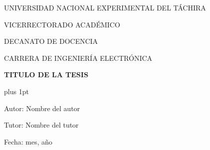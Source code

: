 \begin{center}
	\begin{spacing}{1}
		UNIVERSIDAD NACIONAL EXPERIMENTAL DEL TÁCHIRA
		
		VICERRECTORADO ACADÉMICO
		
		DECANATO DE DOCENCIA
		
		CARRERA DE INGENIERÍA ELECTRÓNICA
	
		\vspace{30pt}

		{\large \textbf{TITULO DE LA TESIS}\par}
	
	\end{spacing}
\end{center}

\vspace{20pt}

\begin{flushright}
	\begin{spacing}{1}
		\parskip=0pt plus 1pt

		Autor: Nombre del autor

		Tutor: Nombre del tutor

		Fecha: mes, año
		
	\end{spacing}	
\end{flushright}

\vspace{10pt}

\begin{abstract}
	\blindtext
\end{abstract}

